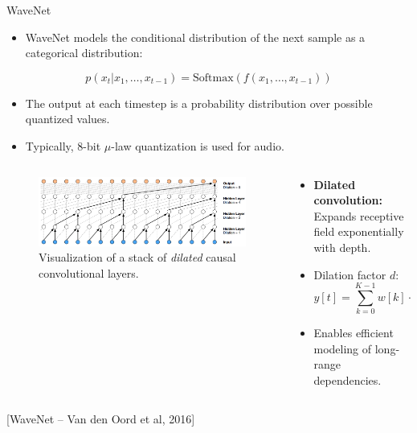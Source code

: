 \begin{frame}[allowframebreaks]{WaveNet}
    \begin{itemize}
        \item WaveNet models the conditional distribution of the next sample as a categorical distribution:
    \end{itemize}
    \begin{equation*}
        p(x_t | x_{1}, \ldots, x_{t-1}) = \mathrm{Softmax}(f(x_{1}, \ldots, x_{t-1}))
    \end{equation*}
    \begin{itemize}
        \item The output at each timestep is a probability distribution over possible quantized values.
        \item Typically, 8-bit $\mu$-law quantization is used for audio.
    \end{itemize}

    \framebreak

    \begin{columns}
        \begin{column}{0.6\linewidth}
            \begin{figure}
                \centering
                \includegraphics[width=1\linewidth]{images/autoregressive/dilated-casual-convolution.png}
                \caption*{Visualization of a stack of \textit{dilated} causal convolutional layers.}
            \end{figure}
        \end{column}
        \begin{column}{0.5\linewidth}
            \begin{itemize}
                \item \textbf{Dilated convolution:} Expands receptive field exponentially with depth.
                \item Dilation factor $d$:
                \begin{equation*}
                    y[t] = \sum_{k=0}^{K-1} w[k] \cdot x[t - d \cdot k]
                \end{equation*}
                \item Enables efficient modeling of long-range dependencies.
            \end{itemize}
        \end{column}
    \end{columns}
    \small [WaveNet – Van den Oord et al, 2016]


\end{frame}
